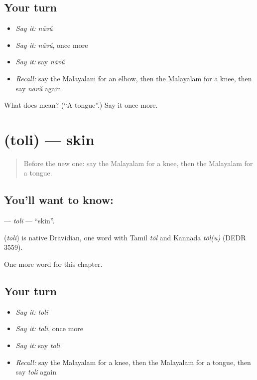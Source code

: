 \subsection*{Your turn}
\begin{itemize}
\raggedright
  \item \emph{Say it:} \emph{nāvŭ}
  \item \emph{Say it:} \emph{nāvŭ}, once more
  \item \emph{Say it:} say \emph{nāvŭ}
  \item \emph{Recall:} say the Malayalam for an elbow, then the Malayalam for a knee, then say \emph{nāvŭ} again
\end{itemize}

\begin{tcolorbox}[breakable,colback=teal!4,colframe=teal!35!black,title={Before you move on}]
What does  mean? (\textquotedblleft{}A tongue\textquotedblright{}.) Say it once more.
\end{tcolorbox}
\section[\texorpdfstring{\ml{തൊലി} (toli)}{തൊലി (toli)}]{ (toli) — skin}

\label{lesson:ML-C154-toli}



\begin{quote}
Before the new one: say the Malayalam for a knee, then the Malayalam for a tongue.
\end{quote}

\subsection*{You'll want to know: }
\textbf{} — \emph{toli} — \textquotedblleft{}skin\textquotedblright{}.

\begin{cousinweb}
\textbf{} (\emph{toli}) is native Dravidian, one word with Tamil \emph{tōl} and Kannada \emph{tōl(u)} (DEDR 3559).
\end{cousinweb}

\begin{grammarlens}[title={What you've built}]
One more word for this chapter.
\end{grammarlens}

\subsection*{Your turn}
\begin{itemize}
\raggedright
  \item \emph{Say it:} \emph{toli}
  \item \emph{Say it:} \emph{toli}, once more
  \item \emph{Say it:} say \emph{toli}
  \item \emph{Recall:} say the Malayalam for a knee, then the Malayalam for a tongue, then say \emph{toli} again
\end{itemize}

